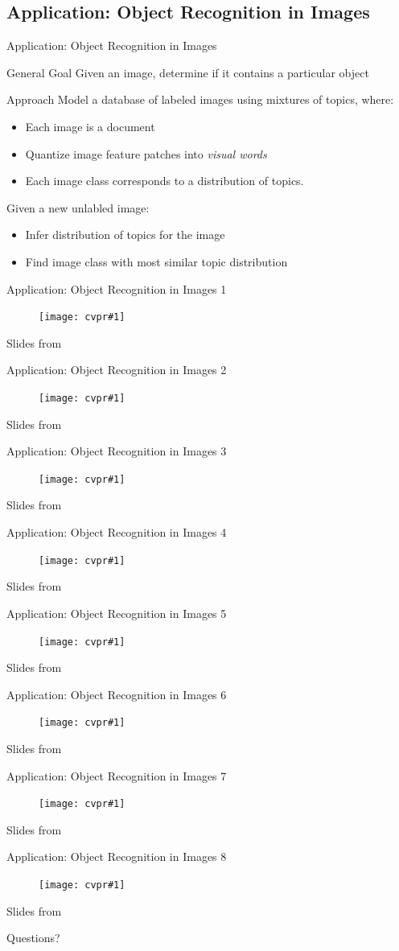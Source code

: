 \documentclass[10pt, svgnames]{beamer}
\begin{document}
\subsection{Application: Object Recognition in Images}
\begin{frame}{Application: Object Recognition in Images}
	\begin{block}{General Goal}
		Given an image, determine if it contains a particular object
	\end{block}
	\begin{block}{Approach}
		Model a database of labeled images using mixtures of topics,
		where:
		\begin{itemize}
			\item Each image is a document
			\item Quantize image feature patches into \textit{visual words}
			\item Each image class corresponds to a distribution of topics.
		\end{itemize}
		Given a new unlabled image:
		\begin{itemize}
			\item Infer distribution of topics for the image
			\item Find image class with most similar topic distribution 
		\end{itemize}
	\end{block}
\end{frame}
\newcommand{\cvprslide}[1]{
\begin{frame}{Application: Object Recognition in Images #1}
	\begin{figure}[ht]
		\begin{center}
			\texttt{[image: cvpr\#1]}
		\end{center}
		\label{fig:cvpr#1}
	\end{figure}
	\footnotesize{Slides from \cite{feifei2007}}
\end{frame}
}
\cvprslide{1}
\cvprslide{2}
\cvprslide{3}
\cvprslide{4}
\cvprslide{5}
\cvprslide{6}
\cvprslide{7}
\cvprslide{8}
\begin{frame}{}
	\begin{center}
		Questions?
	\end{center}
\end{frame}
\end{document}
